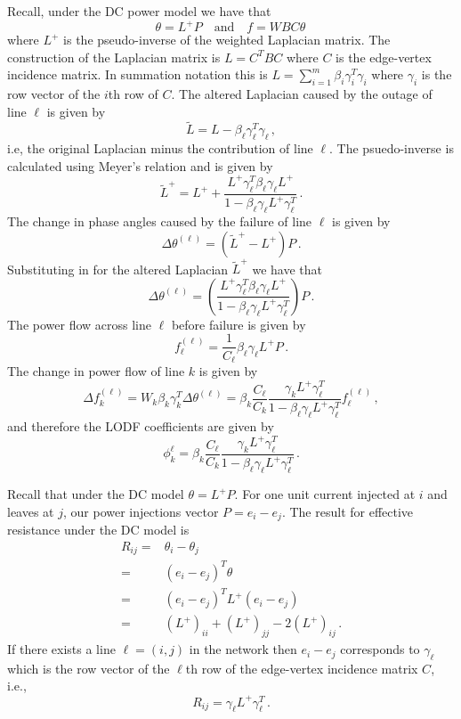 \documentclass{article}
\begin{document}
Recall, under the DC power model we have that 
\[\theta = L^+P\quad \text{and} \quad f = WBC\theta\,\]
where $L^+$ is the pseudo-inverse of the weighted Laplacian matrix. The construction of the Laplacian matrix is $L=C^TBC$ where $C$ is the edge-vertex incidence matrix. In summation notation this is $L = \sum_{i=1}^{m} \beta_i\gamma_i^T\gamma_i$ where $\gamma_i$ is the row vector of the $i$th row of $C$. The altered Laplacian caused by the outage of line $\ell$ is given by
\[\tilde L = L - \beta_{\ell}\gamma_{\ell}^T\gamma_{\ell}\,,\]
i.e, the original Laplacian minus the contribution of line $\ell$.  The psuedo-inverse is calculated using Meyer's relation and is given by
\[\tilde L^+ = L^+ + \frac{L^+\gamma_{\ell}^T\beta_{\ell}\gamma_{\ell}L^+}{1-\beta_{\ell}\gamma_{\ell}L^+\gamma_{\ell}^T}\,.\]
The change in phase angles caused by the failure of line $\ell$ is given by
\[\Delta \theta^{(\ell)} = (\tilde L^+ - L^+)P\,.\]
Substituting in for the altered Laplacian $\tilde L^+$ we have that 
\[\Delta \theta^{(\ell)} = \left(\frac{L^+\gamma_{\ell}^T\beta_{\ell}\gamma_{\ell}L^+}{1-\beta_{\ell}\gamma_{\ell}L^+\gamma_{\ell}^T}\right)P \,. \]
The power flow across line $\ell$ before failure is given by
\[f_{\ell}^{(\ell)} = \frac{1}{C_\ell}\beta_{\ell}\gamma_{\ell}L^+P\,.\]
The change in power flow of line $k$ is given by 
\[\Delta f_k^{(\ell)} = W_k \beta_k \gamma_k^T \Delta \theta^{(\ell)} = \beta_k \frac{C_\ell}{C_k} \frac{\gamma_kL^+\gamma_{\ell}^T}{1-\beta_{\ell}\gamma_{\ell}L^+\gamma_{\ell}^T} f_{\ell}^{(\ell)}\,,\]
and therefore the LODF coefficients are given by
\[\phi_k^{\ell} = \beta_k \frac{C_\ell}{C_k} \frac{\gamma_kL^+\gamma_{\ell}^T}{1-\beta_{\ell}\gamma_{\ell}L^+\gamma_\ell^T}\,.\]

Recall that under the DC model $\theta = L^+P$. For one unit current injected at $i$ and leaves at $j$, our power injections vector $P = e_i-e_j$. The result for effective resistance under the DC model is
\[\begin{aligned} R_{ij} =& \theta_i-\theta_j\\
=& (e_i-e_j)^T\theta\\
=& (e_i-e_j)^TL^+(e_i-e_j)\\
=& (L^+)_{ii} + (L^+)_{jj} -2(L^+)_{ij}\,.
\end{aligned}\]
If there exists a line $\ell = (i,j)$ in the network then $e_i-e_j$ corresponds to $\gamma_\ell$ which is the row vector of the $\ell$th row of the edge-vertex incidence matrix $C$, i.e., 
\[R_{ij} =\gamma_\ell L^+\gamma_\ell^T\,.\] 
\end{document}
